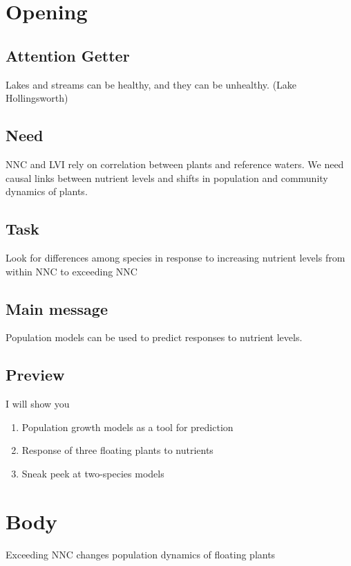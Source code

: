 \documentclass[12pt]{amsart}
\title{}
\author{}
\date{} %
\begin{document}
\maketitle


\section{Opening}
\subsection{Attention Getter} 
Lakes and streams can be healthy, and they can be unhealthy. (Lake Hollingsworth)

\subsection{Need}
NNC and LVI rely on correlation between plants and reference waters. We need causal links between nutrient levels and shifts in population and community dynamics of plants. 

\subsection{Task}
Look for differences among species in response to increasing nutrient levels from within NNC to exceeding NNC

\subsection{Main message}
Population models can be used to predict responses to nutrient levels. 


\subsection{Preview}
I will show you
\begin{enumerate}
\item Population growth models as a tool for prediction
\item Response of three floating plants to nutrients
\item Sneak peek at two-species models
\end{enumerate}

\section{Body}

Exceeding NNC changes population dynamics of floating plants
\end{document}
